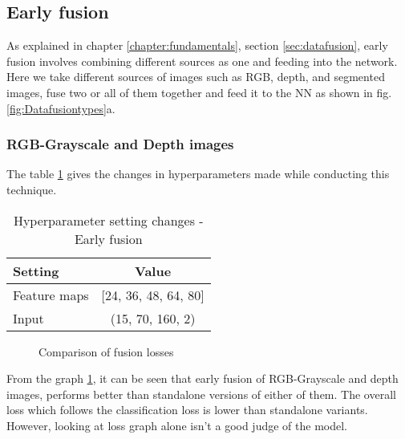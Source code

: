 \subsection{Early fusion}
As explained in chapter \ref{chapter:fundamentals}, section \ref{sec:datafusion}, early
fusion involves combining different sources as one and feeding into the network. Here we
take different sources of images such as RGB, depth, and segmented images, fuse two or all
of them together and feed it to the NN as shown in fig. \ref{fig:Datafusiontypes}a.
\subsubsection*{RGB-Grayscale and Depth images}
The table \ref{table:paramsEF} gives the changes in hyperparameters made while conducting
this technique.

\begin{table}[!ht]
    \centering
\begin{tabular}{lc}
    \toprule
    Setting  & Value  \\\midrule
    Feature maps  & [24, 36, 48, 64, 80]  \\
    Input  & (15, 70, 160, 2)\\\bottomrule
\end{tabular}
\caption{Hyperparameter setting changes - Early fusion}
\label{table:paramsEF}
\end{table}
\begin{figure}[!ht]
    \centering
    \def\svgwidth{\textwidth}
    
    \caption{Comparison of fusion losses}
    \label{fig:datafusionlosses1}
\end{figure}
From the graph \ref{fig:datafusionlosses1}, it can be seen that early fusion of
RGB-Grayscale and depth images, performs better than standalone versions of either of
them. The overall loss which follows the classification loss is lower than standalone
variants. However, looking at loss graph alone isn't a good judge of the model.

